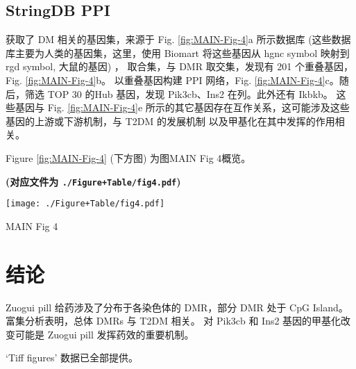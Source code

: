 \documentclass[
]{article}
\begin{document}
\hypertarget{stringdb-ppi}{%
\subsection{StringDB PPI}\label{stringdb-ppi}}

获取了 DM 相关的基因集，来源于 Fig. \ref{fig:MAIN-Fig-4}a 所示数据库
(这些数据库主要为人类的基因集，这里，使用 Biomart 将这些基因从 hgnc symbol 映射到 rgd symbol, 大鼠的基因) ，
取合集，与 DMR 取交集，发现有 201 个重叠基因，Fig. \ref{fig:MAIN-Fig-4}b。
以重叠基因构建 PPI 网络，Fig. \ref{fig:MAIN-Fig-4}c。随后，筛选 TOP 30 的Hub 基因，发现 Pik3cb、Ins2 在列。此外还有 Ikbkb。
这些基因与 Fig. \ref{fig:MAIN-Fig-4}e 所示的其它基因存在互作关系，这可能涉及这些基因的上游或下游机制，与 T2DM 的发展机制
以及甲基化在其中发挥的作用相关。

\begin{center}\vspace{1.5cm}\end{center}

Figure \ref{fig:MAIN-Fig-4} (下方图) 为图MAIN Fig 4概览。

\textbf{(对应文件为 \texttt{./Figure+Table/fig4.pdf})}

\def\@captype{figure}
\begin{center}
\texttt{[image: ./Figure+Table/fig4.pdf]}
\caption{MAIN Fig 4}\label{fig:MAIN-Fig-4}
\end{center}

\begin{center}\vspace{1.5cm}\end{center}

\hypertarget{dis}{%
\section{结论}\label{dis}}

Zuogui pill 给药涉及了分布于各染色体的 DMR，部分 DMR 处于 CpG Island。
富集分析表明，总体 DMRs 与 T2DM 相关。
对 Pik3cb 和 Ins2 基因的甲基化改变可能是 Zuogui pill 发挥药效的重要机制。

\begin{center}\vspace{1.5cm}\end{center}

`Tiff figures' 数据已全部提供。
\end{document}
